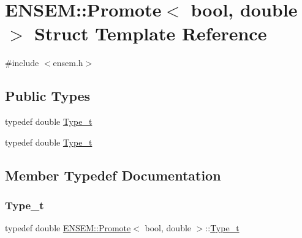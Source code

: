 \hypertarget{structENSEM_1_1Promote_3_01bool_00_01double_01_4}{}\section{E\+N\+S\+EM\+:\+:Promote$<$ bool, double $>$ Struct Template Reference}
\label{structENSEM_1_1Promote_3_01bool_00_01double_01_4}


{\ttfamily \#include $<$ensem.\+h$>$}

\subsection*{Public Types}
\begin{DoxyCompactItemize}
\item 
typedef double \mbox{\hyperlink{structENSEM_1_1Promote_3_01bool_00_01double_01_4_ab5d5c27404016e2042b9c4312b087193}{Type\+\_\+t}}
\item 
typedef double \mbox{\hyperlink{structENSEM_1_1Promote_3_01bool_00_01double_01_4_ab5d5c27404016e2042b9c4312b087193}{Type\+\_\+t}}
\end{DoxyCompactItemize}


\subsection{Member Typedef Documentation}
\mbox{\label{structENSEM_1_1Promote_3_01bool_00_01double_01_4_ab5d5c27404016e2042b9c4312b087193}} 
\subsubsection{\texorpdfstring{Type\_t}{Type\_t}\hspace{0.1cm}{\footnotesize\ttfamily [1/2]}}
{\footnotesize\ttfamily typedef double \mbox{\hyperlink{structENSEM_1_1Promote}{E\+N\+S\+E\+M\+::\+Promote}}$<$ bool, double $>$\+::\mbox{\hyperlink{structENSEM_1_1Promote_3_01bool_00_01double_01_4_ab5d5c27404016e2042b9c4312b087193}{Type\+\_\+t}}}

\mbox{\label{structENSEM_1_1Promote_3_01bool_00_01double_01_4_ab5d5c27404016e2042b9c4312b087193}} 

